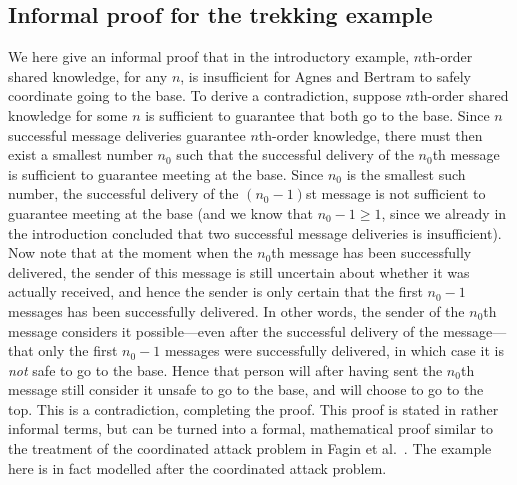 \subsection{Informal proof for the trekking example}
\label{app:trekking-proof}
We here give an informal proof that in the introductory example, $n$th-order shared knowledge, for any $n$, is insufficient for Agnes and Bertram to safely coordinate going to the base. To derive a contradiction, suppose $n$th-order shared knowledge for some $n$ is sufficient to guarantee that both go to the base. Since $n$ successful message deliveries guarantee $n$th-order knowledge, 
there must then exist a smallest number $n_0$ such that the successful delivery of the $n_0$th message is sufficient to guarantee meeting at the base. Since $n_0$ is the smallest such number, the successful delivery of the $(n_0-1)$st message is not sufficient to guarantee meeting at the base (and we know that $n_0-1 \geq 1$, since we already in the introduction concluded that two successful message deliveries is insufficient). Now note that at the moment when the $n_0$th message has been successfully delivered, the sender of this message is still uncertain about whether it was actually received, and hence the sender is only certain that the first $n_0-1$ messages has been successfully delivered.  In other words, the sender of the $n_0$th message considers it possible---even after the successful delivery of the message---that only the first $n_0-1$ messages were successfully delivered, in which case it is \emph{not} safe to go to the base. Hence that person will after having sent the $n_0$th message still consider it unsafe to go to the base, and will choose to go to the top. This is a contradiction, completing the proof. This proof is stated in rather informal terms, but can be turned into a formal, mathematical proof similar to the treatment of the coordinated attack problem in Fagin et al.~\cite{fagin1995reasoning}. The example here is in fact modelled after the coordinated attack problem.


